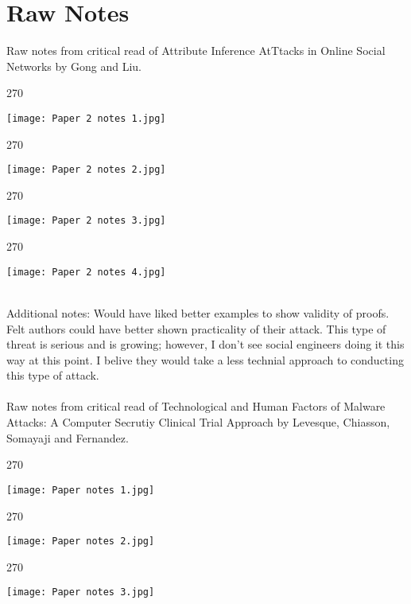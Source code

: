 \documentclass[11pt]{article}
\begin{document}
\section*{Raw Notes }
Raw notes from critical read of Attribute Inference AtTtacks in Online Social Networks by Gong and Liu. 
\\
\begin{turn}{270}
  
\texttt{[image: Paper 2 notes 1.jpg]}

\end{turn}
\begin{turn}{270}
  
\texttt{[image: Paper 2 notes 2.jpg]}

\end{turn}
\begin{turn}{270}

  
\texttt{[image: Paper 2 notes 3.jpg]}

\end{turn}
\begin{turn}{270}

  
\texttt{[image: Paper 2 notes 4.jpg]}

\end{turn}
\\
Additional notes: 
Would have liked better examples to show validity of proofs. 
Felt authors could have better shown practicality of their attack. 
This type of threat is serious and is growing; however, I don't see social engineers doing it this way at this point. I belive they would take a less technial approach to conducting this type of attack. 
\\
\\
Raw notes from critical read of Technological and Human Factors of Malware Attacks: A Computer Secrutiy Clinical Trial Approach by Levesque, Chiasson, Somayaji and Fernandez. \\
\begin{turn}{270}
  
\texttt{[image: Paper notes 1.jpg]}

\end{turn}
\begin{turn}{270}
  
\texttt{[image: Paper notes 2.jpg]}

\end{turn}
\begin{turn}{270}

  
\texttt{[image: Paper notes 3.jpg]}

\end{turn}
\end{document}
